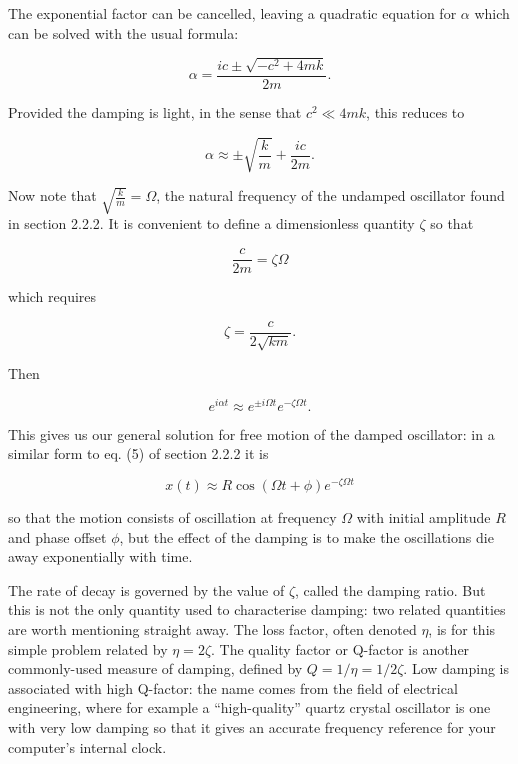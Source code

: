   The exponential factor can be cancelled, leaving a quadratic equation for 
  $\alpha$ which can be solved with the usual formula: 

  \begin{equation*}\alpha = \dfrac{ic \pm \sqrt{-c^2 + 4 m k}}{2m}. 
  \tag{3}\end{equation*} 

  Provided the damping is light, in the sense that $c^2 \ll 4mk$, this reduces 
  to 

  \begin{equation*}\alpha \approx \pm \sqrt{\frac{k}{m}} + \frac{ic}{2m}. 
  \tag{4} \end{equation*} 

  Now note that $\sqrt{\frac{k}{m}}=\Omega$, the natural frequency of the 
  undamped oscillator found in section 2.2.2. It is convenient to define a 
  dimensionless quantity $\zeta$ so that 

  \begin{equation*}\frac{c}{2m} = \zeta \Omega \tag{5} \end{equation*} 

  \noindent{}which requires 

  \begin{equation*}\zeta=\frac{c}{2\sqrt{km}}. \tag{6} \end{equation*} 

  Then 

  \begin{equation*}e^{i \alpha t} \approx e^{\pm i \Omega t} e^{-\zeta \Omega 
  t}. \tag{7} \end{equation*} 

  This gives us our general solution for free motion of the damped oscillator: 
  in a similar form to eq. (5) of section 2.2.2 it is 

  \begin{equation*}x(t) \approx R \cos(\Omega t + \phi) e^{-\zeta \Omega t} 
  \tag{8} \end{equation*} 

  \noindent{}so that the motion consists of oscillation at frequency $\Omega$ 
  with initial amplitude $R$ and phase offset $\phi$, but the effect of the 
  damping is to make the oscillations die away exponentially with time. 

  The rate of decay is governed by the value of $\zeta$, called the damping 
  ratio. But this is not the only quantity used to characterise damping: two 
  related quantities are worth mentioning straight away. The loss factor, often 
  denoted $\eta$, is for this simple problem related by $\eta=2\zeta$. The 
  quality factor or Q-factor is another commonly-used measure of damping, 
  defined by $Q=1/\eta=1/2\zeta$. Low damping is associated with high Q-factor: 
  the name comes from the field of electrical engineering, where for example a 
  ``high-quality'' quartz crystal oscillator is one with very low damping so 
  that it gives an accurate frequency reference for your computer's internal 
  clock. 

